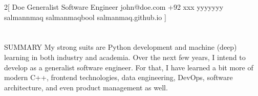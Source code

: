 \documentclass{my_cv}
\begin{document}
\begin{multicols}{2}[
        {Doe}%
        {Generalist Software Engineer}%
        {john@doe.com}%
        {+92 xxx yyyyyyy}%
        {salmannmaq}%
        {salmanmaqbool}%
        {salmanmaq.github.io}
]
\end{multicols}

\section{\faFileText}{SUMMARY}
My strong suits are Python development and machine (deep) learning in both industry and academia. Over the next few years, I intend to develop as a generalist software engineer. For that, I have learned a bit more of modern C++, frontend technologies, data engineering, DevOps, software architecture, and even product management as well.
\end{document}
